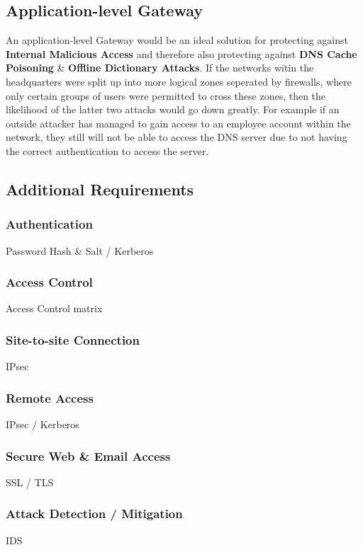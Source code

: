 \documentclass[11pt]{article}
\begin{document}
      \subsection{Application-level Gateway}
        An application-level Gateway would be an ideal solution for protecting against \textbf{Internal Malicious Access} and therefore also protecting against \textbf{DNS Cache Poisoning} \& \textbf{Offline Dictionary Attacks}. If the networks witin the headquarters were split up into more logical zones seperated by firewalls, where only certain groups of users were permitted to cross these zones, then the likelihood of the latter two attacks would go down greatly. For example if an outside attacker has managed to gain access to an employee account within the network, they still will not be able to access the DNS server due to not having the correct authentication to access the server.

      \subsection{Additional Requirements}
        \subsubsection{Authentication}
          Password Hash \& Salt / Kerberos

        \subsubsection{Access Control}
          Access Control matrix

        \subsubsection{Site-to-site Connection}
          IPsec

        \subsubsection{Remote Access}
          IPsec / Kerberos

        \subsubsection{Secure Web \& Email Access}
          SSL / TLS

        \subsubsection{Attack Detection / Mitigation}
          IDS
\end{document}
